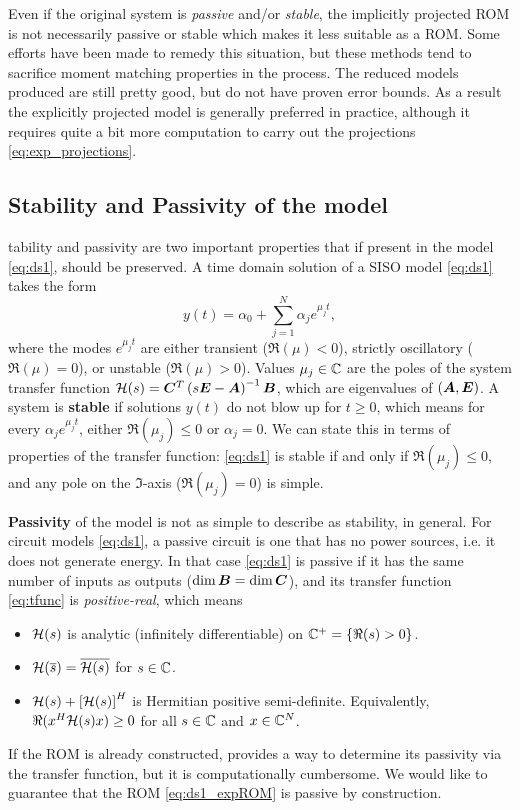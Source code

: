 \medskip
Even if the original system is \emph{passive} and/or \emph{stable}, the implicitly projected ROM is not necessarily passive or stable  which makes it less suitable as a ROM.   Some efforts  \cite{arnoldiMOR,grimme1996restart,jaimoukha1997implicitMOR} have been made to remedy this situation, but these methods tend to sacrifice moment matching properties in the process.  The reduced models produced are still pretty good, but do not have proven error bounds.  As a result the explicitly projected model is generally preferred in practice, although it requires quite a bit more computation to carry out the projections \eqref{eq:exp_projections}.

\clearpage
\subsection{Stability and Passivity of the model}\label{sec:stability_passivity}
tability and passivity are two important properties that if present in the model \eqref{eq:ds1}, should be preserved.  A time domain solution of a SISO model \eqref{eq:ds1} takes the form
\[
y(t) = \alpha_0 + \sum_{j=1}^N  \alpha_j e^{\mu_j t},
\]
where the modes $e^{\mu_j t}$ are either transient ($\Re(\mu)<0$), strictly oscillatory ($\Re(\mu)=0$), or unstable ($\Re(\mu)>0$).   Values $\mu_j\in\mathbb{C}$ are the poles of the system transfer function $\mathcal{H}(s) = \bm{C}^T\left(s\bm{E}-\bm{A}\right)^{-1}\bm{B}$, which are eigenvalues of $(\bm{A},\bm{E})$.  A system is \textbf{stable} if solutions $y(t)$ do not blow up for $t\geq 0$, which means for every $\alpha_j e^{\mu_j t}$, either $\Re(\mu_j)\leq 0$ or $\alpha_j =0$.   We can state this in terms of properties of the transfer function: \eqref{eq:ds1} is stable if and only if $\Re(\mu_j)\leq 0$, and any pole on the $\Im$-axis ($\Re(\mu_j)=0$) is simple.  

\textbf{Passivity} of the model is not as simple to describe as stability, in general.  For circuit models \eqref{eq:ds1},  a passive circuit is one that has no power sources, i.e. it does not generate energy.   In that case \eqref{eq:ds1} is passive if it has the same number of inputs as outputs ($\dim \bm{B}=\dim \bm{C}$), and its transfer function \eqref{eq:tfunc} is \emph{positive-real}, which means
\begin{itemize}
\item $\mathcal{H}(s)$ is analytic (infinitely differentiable) on $\mathbb{C}^+=\{ \Re(s)>0 \}$.
\item $\mathcal{H}(\overline{s}) = \overline{\mathcal{H}(s)}$ for $s\in\mathbb{C}$.
\item $\mathcal{H}(s) + \left[ \mathcal{H}(s) \right]^H$ is Hermitian positive semi-definite. 
Equivalently, $\Re(x^H \mathcal{H}(s) x) \geq 0$ for all $s\in\mathbb{C}$ and $x\in\mathbb{C}^N$.
\end{itemize}   
 If the ROM is already constructed, \cite{posreal} provides a way to determine its passivity via the transfer function, but it is computationally cumbersome.  We would like to guarantee that the ROM \eqref{eq:ds1_expROM} is passive by construction.   


